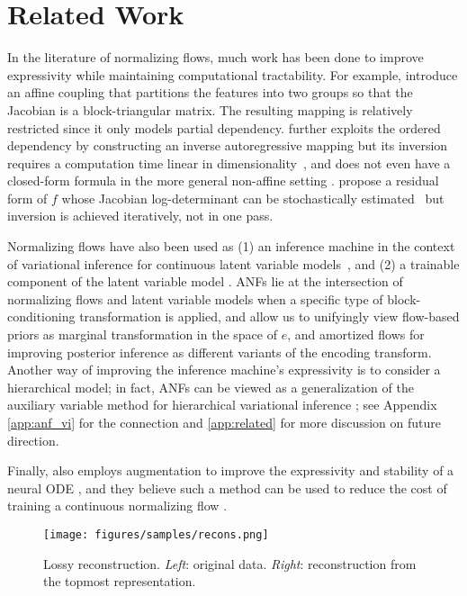 \documentclass{article}
\begin{document}
\section{Related Work}
In the literature of normalizing flows, much work has been done to improve expressivity while maintaining computational tractability. 
For example, \citet{dinh2014nice,dinh2016density} introduce an affine coupling that partitions the features into two groups so that the Jacobian is a block-triangular matrix. 
The resulting mapping is relatively restricted since it only models partial dependency. 
\citet{kingma2016improved} further exploits the ordered dependency by constructing an inverse autoregressive mapping but its inversion requires a computation time linear in dimensionality~\citep{papamakarios2017masked}, 
and does not even have a closed-form formula in the more general non-affine setting \citep{huang2018neural}.
\citet{behrmann2018invertible} propose a residual form of $f$ whose Jacobian log-determinant can be stochastically estimated~\citep{chen2019residualflows} but inversion is achieved iteratively, not in one pass. 

Normalizing flows have also been used as (1) an inference machine in the context of variational inference for continuous latent variable models~\citep{kingma2016improved,tomczak2016improving,berg2018sylvester}, and (2) a trainable component of the latent variable model \citep{chen2016variational,agrawal2016deep,huang2017learnable}.
ANFs lie at the intersection of normalizing flows and latent variable models when a specific type of block-conditioning transformation is applied, and allow us to 
unifyingly view
flow-based priors as marginal transformation in the space of $e$, and amortized flows for improving posterior inference as different variants of the encoding transform. 
Another way of improving the inference machine's expressivity is to consider a hierarchical model; in fact, ANFs can be viewed as a generalization of the auxiliary variable method for hierarchical variational inference \citep{agakov2004auxiliary,ranganath2016hierarchical}; see Appendix \ref{app:anf_vi} for the connection and \ref{app:related} for more discussion on future direction. 

Finally, \citet{dupont2019augmented} also employs augmentation to improve the expressivity and stability of a neural ODE \citep{chen2018neural}, and they believe such a method can be used to reduce the cost of training a continuous normalizing flow \citep{grathwohl2018ffjord}.

\begin{figure}
    \centering
    \texttt{[image: figures/samples/recons.png]}
    \caption{Lossy reconstruction. \emph{Left}: original data. \emph{Right}: reconstruction from the topmost representation.}
    \label{fig:recon}
\end{figure}
\end{document}

